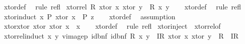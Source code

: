 \begin{isabellebody}
\isamarkupfalse%
\ xtor{\isacharunderscore}{\kern0pt}def\ \isamarkupfalse%
\ {\isacharparenleft}{\kern0pt}rule\ refl{\isacharparenright}{\kern0pt}%
\endisatagproof
{\isafoldproof}%
%
\isadelimproof
\isanewline
%
\endisadelimproof
\isanewline
{}\isamarkupfalse%
\ xtor{\isacharunderscore}{\kern0pt}rel{\isacharcolon}{\kern0pt}\ {\isachardoublequoteopen}R\ {\isacharparenleft}{\kern0pt}xtor\ x{\isacharparenright}{\kern0pt}\ {\isacharparenleft}{\kern0pt}xtor\ y{\isacharparenright}{\kern0pt}\ {\isacharequal}{\kern0pt}\ R\ x\ y{\isachardoublequoteclose}\isanewline
%
\isadelimproof
\ \ %
\endisadelimproof
%
\isatagproof
{}\isamarkupfalse%
\ xtor{\isacharunderscore}{\kern0pt}def\ \isamarkupfalse%
\ {\isacharparenleft}{\kern0pt}rule\ refl{\isacharparenright}{\kern0pt}%
\endisatagproof
{\isafoldproof}%
%
\isadelimproof
\isanewline
%
\endisadelimproof
\isanewline
{}\isamarkupfalse%
\ xtor{\isacharunderscore}{\kern0pt}induct{\isacharcolon}{\kern0pt}\ {\isachardoublequoteopen}{\isacharparenleft}{\kern0pt}{\isasymAnd}x{\isachardot}{\kern0pt}\ P\ {\isacharparenleft}{\kern0pt}xtor\ x{\isacharparenright}{\kern0pt}{\isacharparenright}{\kern0pt}\ {\isasymLongrightarrow}\ P\ z{\isachardoublequoteclose}\isanewline
%
\isadelimproof
\ \ %
\endisadelimproof
%
\isatagproof
{}\isamarkupfalse%
\ xtor{\isacharunderscore}{\kern0pt}def\ \isamarkupfalse%
\ assumption%
\endisatagproof
{\isafoldproof}%
%
\isadelimproof
\isanewline
%
\endisadelimproof
\isanewline
{}\isamarkupfalse%
\ xtor{\isacharunderscore}{\kern0pt}xtor{\isacharcolon}{\kern0pt}\ {\isachardoublequoteopen}xtor\ {\isacharparenleft}{\kern0pt}xtor\ x{\isacharparenright}{\kern0pt}\ {\isacharequal}{\kern0pt}\ x{\isachardoublequoteclose}\isanewline
%
\isadelimproof
\ \ %
\endisadelimproof
%
\isatagproof
{}\isamarkupfalse%
\ xtor{\isacharunderscore}{\kern0pt}def\ \isamarkupfalse%
\ {\isacharparenleft}{\kern0pt}rule\ refl{\isacharparenright}{\kern0pt}%
\endisatagproof
{\isafoldproof}%
%
\isadelimproof
\isanewline
%
\endisadelimproof
\isanewline
{}\isamarkupfalse%
\ xtor{\isacharunderscore}{\kern0pt}inject\ {\isacharequal}{\kern0pt}\ xtor{\isacharunderscore}{\kern0pt}rel{\isacharbrackleft}{\kern0pt}of\ {\isachardoublequoteopen}{\isacharparenleft}{\kern0pt}{\isacharequal}{\kern0pt}{\isacharparenright}{\kern0pt}{\isachardoublequoteclose}{\isacharbrackright}{\kern0pt}\isanewline
\isanewline
{}\isamarkupfalse%
\ xtor{\isacharunderscore}{\kern0pt}rel{\isacharunderscore}{\kern0pt}induct{\isacharcolon}{\kern0pt}\ {\isachardoublequoteopen}{\isacharparenleft}{\kern0pt}{\isasymAnd}x\ y{\isachardot}{\kern0pt}\ vimage{}p\ id{\isacharunderscore}{\kern0pt}bnf\ id{\isacharunderscore}{\kern0pt}bnf\ R\ x\ y\ {\isasymLongrightarrow}\ IR\ {\isacharparenleft}{\kern0pt}xtor\ x{\isacharparenright}{\kern0pt}\ {\isacharparenleft}{\kern0pt}xtor\ y{\isacharparenright}{\kern0pt}{\isacharparenright}{\kern0pt}\ {\isasymLongrightarrow}\ R\ {\isasymle}\ IR{\isachardoublequoteclose}\isanewline

\end{isabellebody}
